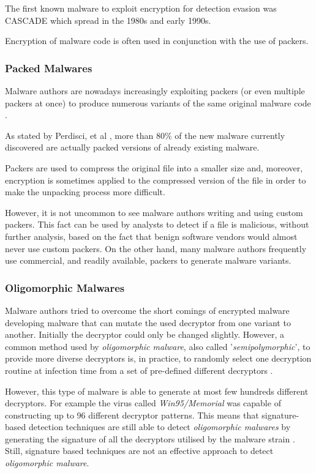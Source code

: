 \documentclass[pdfa%
,cucitura%
]{toptesi}
\begin{document}
The first known malware to exploit encryption for detection evasion was CASCADE which spread in the 1980s and early 1990s.

Encryption of malware code is often used in conjunction with the use of packers.

\color{Black}
\subsubsection{Packed Malwares}
Malware authors are nowadays increasingly exploiting packers (or even multiple packers at once) to produce numerous variants of the same original malware code \cite{NamanyaTWM}.

As stated by Perdisci, et al \cite{PerdisciCPEACVD}, more than 80\% of the new malware currently discovered are actually packed versions of already existing malware.

Packers are used to compress the original file into a smaller size and, moreover, encryption is sometimes applied to the compressed version of the file in order to make the unpacking process more difficult.

However, it is not uncommon to see malware authors writing and using custom packers. This fact can be used by analysts to detect if a file is malicious, without further analysis, based on the fact that benign software vendors would almost never use custom packers. On the other hand, many malware authors frequently use commercial, and readily available, packers to generate malware variants.

\subsubsection{Oligomorphic Malwares}
Malware authors tried to overcome the short comings of encrypted malware developing malware that can mutate the used decryptor from one variant to another. Initially the decryptor could only be changed slightly. However, a common method used by \textit{oligomorphic malware}, also called '\textit{semipolymorphic}', to provide more diverse decryptors is, in practice, to randomly select one decryption routine at infection time from a set of pre-defined different decryptors \cite{Sharma_2014}.

However, this type of malware is able to generate at most few hundreds different decryptors. For example the virus called \textit{Win95/Memorial} was capable of constructing up to 96 different decryptor patterns. This means that signature-based detection techniques are still able to detect \textit{oligomorphic malwares} by generating the signature of all the decryptors utilised by the malware strain \cite{YouMOT}. Still, signature based techniques are not an effective approach to detect \textit{oligomorphic malware}.
\end{document}

